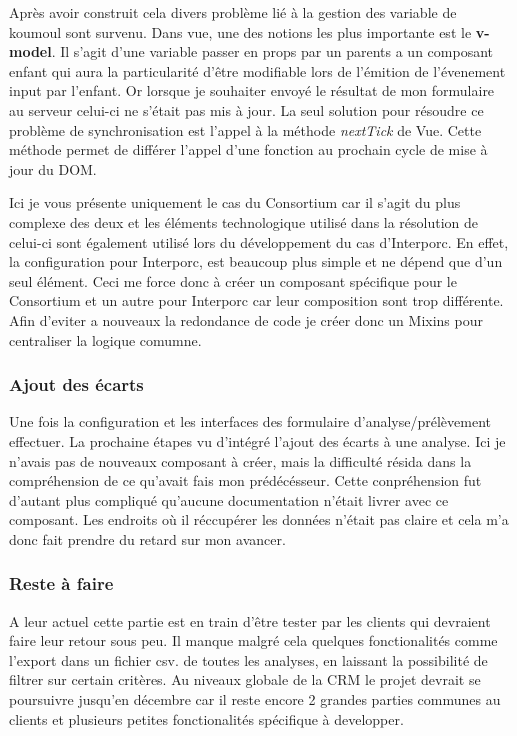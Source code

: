 Après avoir construit cela divers problème lié à la gestion des variable de koumoul sont survenu. Dans vue, une des notions les plus importante est le \textbf{v-model}\cite{vmodel}. Il s'agit d'une variable passer en props par un parents a un composant enfant qui aura la particularité d'être modifiable lors de l'émition de l'évenement input par l'enfant. Or lorsque je souhaiter envoyé le résultat de mon formulaire au serveur celui-ci ne s'était pas mis à jour. La seul solution pour résoudre ce problème de synchronisation est l'appel à la méthode \textit{nextTick}\cite{nextTick} de Vue. Cette méthode permet de différer l'appel d'une fonction au prochain cycle de mise à jour du DOM.


Ici je vous présente uniquement le cas du Consortium car il s'agit du plus complexe des deux et les éléments technologique utilisé dans la résolution de celui-ci sont également utilisé lors du développement du cas d'Interporc. En effet, la configuration pour Interporc, est beaucoup plus simple et ne dépend que d'un seul élément. Ceci me force donc à créer un composant spécifique pour le Consortium et un autre pour Interporc car leur composition sont trop différente. Afin d'eviter a nouveaux la redondance de code je créer donc un Mixins pour centraliser la logique comumne. 

\subsubsection{Ajout des écarts}
Une fois la configuration et les interfaces des formulaire d'analyse/prélèvement effectuer. La prochaine étapes vu d'intégré l'ajout des écarts à une analyse. Ici je n'avais pas de nouveaux composant à créer, mais la difficulté résida dans la compréhension de ce qu'avait fais mon prédécésseur. Cette conpréhension fut d'autant plus compliqué qu'aucune documentation n'était livrer avec ce composant. Les endroits où il réccupérer les données n'était pas claire et cela m'a donc fait prendre du retard sur mon avancer. 

\subsubsection{Reste à faire}
A leur actuel cette partie est en train d'être tester par les clients qui devraient faire leur retour sous peu. Il manque malgré cela quelques fonctionalités comme l'export dans un fichier csv. de toutes les analyses, en laissant la possibilité de filtrer sur certain critères. Au niveaux globale de la CRM le projet devrait se poursuivre jusqu'en décembre car il reste encore 2 grandes parties communes au clients et plusieurs petites fonctionalités spécifique à developper.  
